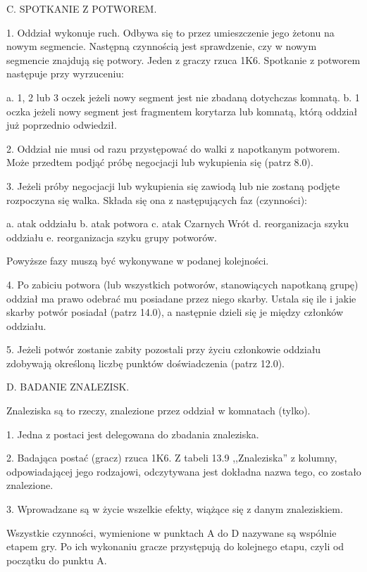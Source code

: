 C. SPOTKANIE Z POTWOREM.

1.
Oddział wykonuje ruch.
Odbywa się to przez umieszczenie jego żetonu na nowym segmencie.
Następną czynnością jest sprawdzenie, czy w nowym segmencie znajdują się potwory.
Jeden z graczy rzuca 1K6.
Spotkanie z potworem następuje przy wyrzuceniu:

a.
1, 2 lub 3 oczek jeżeli nowy segment jest nie zbadaną dotychczas komnatą. b.
1 oczka jeżeli nowy segment jest fragmentem korytarza lub komnatą, którą oddział już poprzednio odwiedził.

2.
Oddział nie musi od razu przystępować do walki z napotkanym potworem.
Może przedtem podjąć próbę negocjacji lub wykupienia się (patrz 8.0).

3.
Jeżeli próby negocjacji lub wykupienia się zawiodą lub nie zostaną podjęte rozpoczyna się walka.
Składa się ona z następujących faz (czynności):

a. atak oddziału b. atak potwora c. atak Czarnych Wrót d. reorganizacja szyku oddziału e. reorganizacja szyku grupy potworów.

Powyższe fazy muszą być wykonywane w podanej kolejności.

4.
Po zabiciu potwora (lub wszystkich potworów, stanowiących napotkaną grupę) oddział ma prawo odebrać mu posiadane przez niego skarby.
Ustala się ile i jakie skarby potwór posiadał (patrz 14.0), a następnie dzieli się je między członków oddziału.

5.
Jeżeli potwór zostanie zabity pozostali przy życiu członkowie oddziału zdobywają określoną liczbę punktów doświadczenia (patrz 12.0).

D. BADANIE ZNALEZISK.

Znaleziska są to rzeczy, znalezione przez oddział w komnatach (tylko).

1.
Jedna z postaci jest delegowana do zbadania znaleziska.

2.
Badająca postać (gracz) rzuca 1K6.
Z tabeli 13.9 ,,Znaleziska'' z kolumny, odpowiadającej jego rodzajowi, odczytywana jest dokładna nazwa tego, co zostało znalezione.

3.
Wprowadzane są w życie wszelkie efekty, wiążące się z danym znaleziskiem.

Wszystkie czynności, wymienione w punktach A do D nazywane są wspólnie etapem gry.
Po ich wykonaniu gracze przystępują do kolejnego etapu, czyli od początku do punktu A.